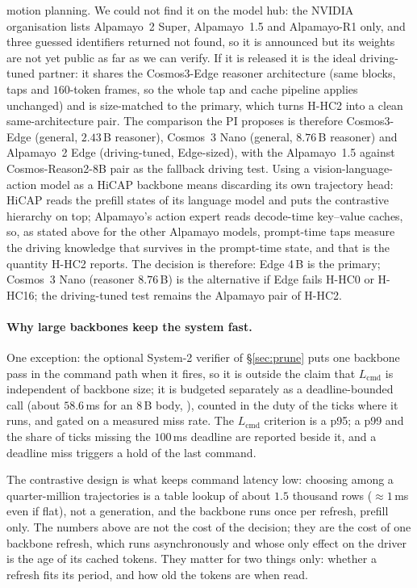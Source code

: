 motion planning\evI. We could not find it on the model hub: the NVIDIA organisation lists Alpamayo~2 Super, Alpamayo~1.5 and Alpamayo-R1 only, and three guessed identifiers returned not found, so it is announced but its weights are not yet public as far as we can verify. If it is released it is the ideal driving-tuned partner: it shares the Cosmos3-Edge reasoner architecture (same blocks, taps and $160$-token frames, so the whole tap and cache pipeline applies unchanged) and is size-matched to the primary, which turns H-HC2 into a clean same-architecture pair. The comparison the PI proposes is therefore Cosmos3-Edge (general, $2.43$\,B reasoner), Cosmos~3 Nano (general, $8.76$\,B reasoner) and Alpamayo~2 Edge (driving-tuned, Edge-sized), with the Alpamayo~1.5 against Cosmos-Reason2-8B pair as the fallback driving test. Using a vision-language-action model as a HiCAP backbone means discarding its own trajectory head: HiCAP reads the prefill states of its language model and puts the contrastive hierarchy on top; Alpamayo's action expert reads decode-time key--value caches, so, as stated above for the other Alpamayo models, prompt-time taps measure the driving knowledge that survives in the prompt-time state, and that is the quantity H-HC2 reports. The decision is therefore: Edge 4\,B is the primary; Cosmos~3 Nano (reasoner $8.76$\,B) is the alternative if Edge fails H-HC0 or H-HC16; the driving-tuned test remains the Alpamayo pair of H-HC2.

\paragraph{Why large backbones keep the system fast.}
One exception: the optional System-2 verifier of \S\ref{sec:prune} puts one backbone pass in the command path when it fires, so it is outside the claim that $L_{\text{cmd}}$ is independent of backbone size; it is budgeted separately as a deadline-bounded call (about $58.6$\,ms for an 8\,B body, \evE), counted in the duty of the ticks where it runs, and gated on a measured miss rate. The $L_{\text{cmd}}$ criterion is a p95; a p99 and the share of ticks missing the $100$\,ms deadline are reported beside it, and a deadline miss triggers a hold of the last command.

The contrastive design is what keeps command latency low: choosing among a quarter-million trajectories is a table lookup of about $1.5$ thousand rows ($\approx1$\,ms even if flat), not a generation, and the backbone runs once per refresh, prefill only. The numbers above are not the cost of the decision; they are the cost of one backbone refresh, which runs asynchronously and whose only effect on the driver is the age of its cached tokens. They matter for two things only: whether a refresh fits its period, and how old the tokens are when read.

